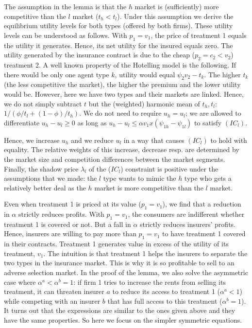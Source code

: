 \documentclass[12pt,english,a4paper]{article}
\begin{document}
The assumption in the lemma is that the \(h\) market is (sufficiently) more competitive than the \(l\) market (\(t_h < t_l\)). Under this assumption we derive the equilibrium utility levels for both types (offered by both firms). These utility levels can be understood as follows. With \(p_1=v_1\), the price of treatment 1 equals the utility it generates. Hence, its net utility for the insured equals zero. The utility generated by the insurance contract is due to the cheap (\(p_2=c_2<v_2\)) treatment 2. A well known property of the Hotelling model is the following.  If there would be only one agent type \(k\), utility would equal \(\psi_2 v_2 -t_k\). The higher \(t_k\) (the less competitive the market), the higher the premium and the lower utility would be. However, here we have two types and their markets are linked. Hence, we do not simply subtract \(t\) but the (weighted) harmonic mean of \(t_h,t_l\): \(1/(\phi/t_l+(1-\phi)/t_h)\). We do not need to require \(u_h=u_l\); we are allowed to differentiate \(u_h-u_l\geq 0\) as long as \(u_h-u_l \leq \alpha v_1 x(\psi_{1h}-\psi_{1l})\) to satisfy \((IC_l)\).

Hence, we increase \(u_h\) and we reduce \(u_l\) in a way that causes \((IC_l)\) to hold with equality. The relative weights of this increase, decrease resp. are determined by the market size and competition differences between the market segments. Finally, the shadow price \(\lambda_l\) of the (\(IC_l\)) constraint is positive under the assumptions that we made: the \(l\) type wants to mimic the \(h\) type who gets a relatively better deal as the \(h\) market is more competitive than the \(l\) market.

Even when treatment 1 is priced at its value (\(p_1=v_1\)), we find that a reduction in \(\alpha\) strictly reduces profits. With \(p_1=v_1\), the consumers are indifferent whether treatment 1 is covered or not. But a fall in \(\alpha\) strictly reduces insurers' profits. Hence, insurers are willing to pay more than \(p_1=v_1\) to have treatment 1 covered in their contracts. Treatment 1 generates value in excess of the utility of its treatment, \(v_1\). The intuition is that treatment 1 helps the insurers to separate the two types in the insurance market. This is why it is so profitable to sell to an adverse selection market. In the proof of the lemma, we also solve the asymmetric case where \(\alpha^a< \alpha^b =1\): if firm 1 tries to increase the rents from selling its treatment, it can threaten insurer \(a\) to reduce its access to treatment 1 (\(\alpha^a <1\)) while competing with an insurer \(b\) that has full access to this treatment (\(\alpha^b =1\)). It turns out that the expressions are similar to the ones given above and they have the same properties. So here we focus on the simpler symmetric equations.
\end{document}
